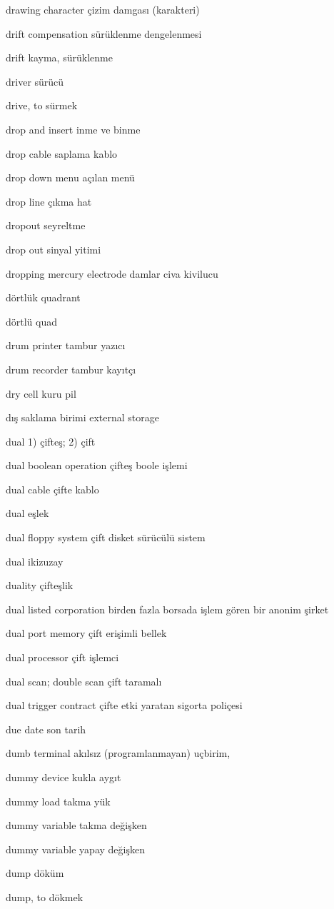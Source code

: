 \documentclass[12pt,fleqn]{article}\usepackage{../../common}
\begin{document}
drawing character çizim damgası (karakteri)

drift compensation sürüklenme dengelenmesi

drift kayma, sürüklenme

driver sürücü

drive, to sürmek

drop and insert inme ve binme

drop cable saplama kablo

drop down menu açılan menü

drop line çıkma hat

dropout seyreltme

drop out sinyal yitimi

dropping mercury electrode damlar civa kivilucu

dörtlük quadrant

dörtlü quad

drum printer tambur yazıcı

drum recorder tambur kayıtçı

dry cell kuru pil

dış saklama birimi external storage

dual 1) çifteş; 2) çift

dual boolean operation çifteş boole işlemi

dual cable çifte kablo

dual eşlek

dual floppy system çift disket sürücülü sistem

dual ikizuzay

duality çifteşlik

dual listed corporation birden fazla borsada işlem gören bir anonim şirket

dual port memory çift erişimli bellek

dual processor çift işlemci

dual scan; double scan çift taramalı

dual trigger contract çifte etki yaratan sigorta poliçesi

due date son tarih

dumb terminal akılsız (programlanmayan) uçbirim,

dummy device kukla aygıt

dummy load takma yük

dummy variable takma değişken

dummy variable yapay değişken

dump döküm

dump, to dökmek
\end{document}
